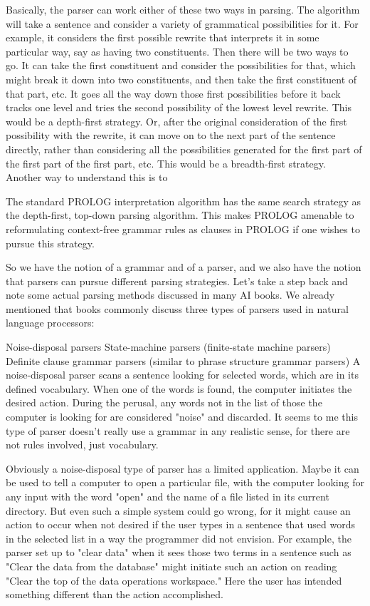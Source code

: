 Basically, the parser can work either of these two ways in parsing. The algorithm will take a sentence and consider a variety of grammatical possibilities for it. For example, it considers the first possible rewrite that interprets it in some particular way, say as having two constituents. Then there will be two ways to go. It can take the first constituent and consider the possibilities for that, which might break it down into two constituents, and then take the first constituent of that part, etc. It goes all the way down those first possibilities before it back tracks one level and tries the second possibility of the lowest level rewrite. This would be a depth-first strategy. Or, after the original consideration of the first possibility with the rewrite, it can move on to the next part of the sentence directly, rather than considering all the possibilities generated for the first part of the first part of the first part, etc. This would be a breadth-first strategy. Another way to understand this is to

The standard PROLOG interpretation algorithm has the same search strategy as the depth-first, top-down parsing algorithm. This makes PROLOG amenable to reformulating context-free grammar rules as clauses in PROLOG if one wishes to pursue this strategy.

So we have the notion of a grammar and of a parser, and we also have the notion that parsers can pursue different parsing strategies. Let's take a step back and note some actual parsing methods discussed in many AI books. We already mentioned that books commonly discuss three types of parsers used in natural language processors:

Noise-disposal parsers
State-machine parsers (finite-state machine parsers)
Definite clause grammar parsers (similar to phrase structure grammar parsers)
A noise-disposal parser scans a sentence looking for selected words, which are in its defined vocabulary. When one of the words is found, the computer initiates the desired action. During the perusal, any words not in the list of those the computer is looking for are considered "noise" and discarded. It seems to me this type of parser doesn't really use a grammar in any realistic sense, for there are not rules involved, just vocabulary.

Obviously a noise-disposal type of parser has a limited application. Maybe it can be used to tell a computer to open a particular file, with the computer looking for any input with the word "open" and the name of a file listed in its current directory. But even such a simple system could go wrong, for it might cause an action to occur when not desired if the user types in a sentence that used words in the selected list in a way the programmer did not envision. For example, the parser set up to "clear data" when it sees those two terms in a sentence such as "Clear the data from the database" might initiate such an action on reading "Clear the top of the data operations workspace." Here the user has intended something different than the action accomplished.

